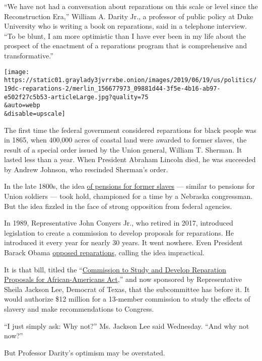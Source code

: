 ``We have not had a conversation about reparations on this scale or
level since the Reconstruction Era,'' William A. Darity Jr., a professor
of public policy at Duke University who is writing a book on
reparations, said in a telephone interview. ``To be blunt, I am more
optimistic than I have ever been in my life about the prospect of the
enactment of a reparations program that is comprehensive and
transformative.''

\texttt{[image: https://static01.graylady3jvrrxbe.onion/images/2019/06/19/us/politics/19dc-reparations-2/merlin\_156677973\_09881d44-3f5e-4b16-ab97-e502f27c5b53-articleLarge.jpg?quality=75\\\&auto=webp\\\&disable=upscale]}

The first time the federal government considered reparations for black
people was in 1865, when 400,000 acres of coastal land were awarded to
former slaves, the result of a special order issued by the Union
general, William T. Sherman. It lasted less than a year. When President
Abraham Lincoln died, he was succeeded by Andrew Johnson, who rescinded
Sherman's order.

In the late 1800s, the idea
\href{https://www.archives.gov/publications/prologue/2010/summer/slave-pension.html}{of
pensions for former slaves} --- similar to pensions for Union soldiers
--- took hold, championed for a time by a Nebraska congressman. But the
idea fizzled in the face of strong opposition from federal agencies.

In 1989, Representative John Conyers Jr., who retired in 2017,
introduced legislation to create a commission to develop proposals for
reparations. He introduced it every year for nearly 30 years. It went
nowhere. Even President Barack Obama
\href{https://www.theatlantic.com/politics/archive/2016/12/ta-nehisi-coates-obama-transcript-ii/511133/}{opposed
reparations}, calling the idea impractical.

It is that bill, titled the
``\href{https://www.congress.gov/bill/116th-congress/house-bill/40/text}{Commission
to Study and Develop Reparation Proposals for African-Americans Act},''
and now sponsored by Representative Sheila Jackson Lee, Democrat of
Texas, that the subcommittee has before it. It would authorize \$12
million for a 13-member commission to study the effects of slavery and
make recommendations to Congress.

``I just simply ask: Why not?'' Ms. Jackson Lee said Wednesday. ``And
why not now?''

But Professor Darity's optimism may be overstated.

